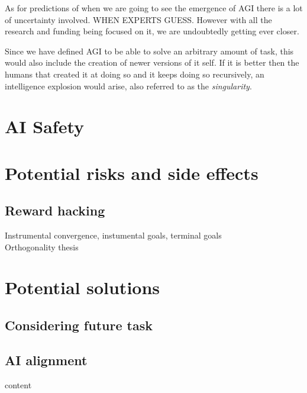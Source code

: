 \documentclass{report}
\theoremstyle{definition}
\begin{document}
As for predictions of when we are going to see the emergence of AGI there is a lot of uncertainty involved. WHEN EXPERTS GUESS. However with all the research and funding being focused on it, we are undoubtedly getting ever closer.

Since we have defined AGI to be able to solve an arbitrary amount of task, this would also include the creation of newer versions of it self. If it is better then the humans that created it at doing so and it keeps doing so recursively, an intelligence explosion would arise, also referred to as the \textit{singularity}.


\section{AI Safety}


\section{Potential risks and side effects}

\subsection{Reward hacking}

Instrumental convergence, instumental goals, terminal goals\\

Orthogonality thesis\\


\section{Potential solutions}

\subsection{Considering future task}


\subsection{AI alignment}
content\\ 
\end{document}
